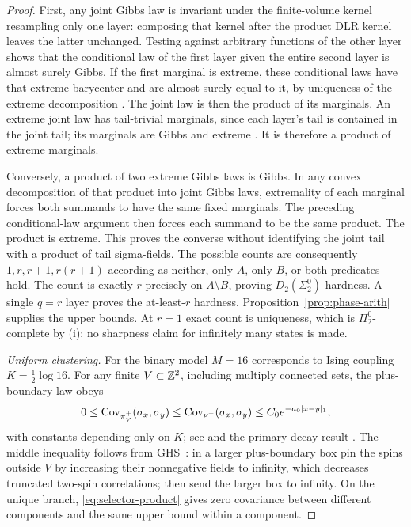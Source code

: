 \begin{proof}
First, any joint Gibbs law is invariant under the finite-volume kernel
resampling only one layer: composing that kernel after the product DLR
kernel leaves the latter unchanged. Testing against arbitrary functions of
the other layer shows that the conditional law of the first layer given the
entire second layer is almost surely Gibbs. If the first marginal is extreme,
these conditional laws have that extreme barycenter and are almost surely
equal to it, by uniqueness of the extreme decomposition
\cite[Theorem 7.26]{Georgii}. The joint law is then the product of its marginals.
An extreme joint law has tail-trivial marginals, since each layer's tail is
contained in the joint tail; its marginals are Gibbs and extreme
\cite[Theorem 7.7]{Georgii}. It is therefore a product of extreme marginals.

Conversely, a product of two extreme Gibbs laws is Gibbs. In any convex
decomposition of that product into joint Gibbs laws, extremality of each
marginal forces both summands to have the same fixed marginals. The preceding
conditional-law argument then forces each summand to be the same product.
The product is extreme. This proves the converse without identifying the
joint tail with a product of tail sigma-fields.
The possible counts are consequently $1,r,r+1,r(r+1)$ according as neither,
only $A$, only $B$, or both predicates hold. The count is exactly $r$ precisely
on $A\setminus B$, proving $D_2(\Sigma^0_2)$ hardness. A single $q=r$ layer
proves the at-least-$r$ hardness. Proposition~\ref{prop:phase-arith} supplies
the upper bounds. At $r=1$ exact count is uniqueness, which is
$\Pi^0_2$-complete by (i); no sharpness claim for infinitely many states is made.

\emph{Uniform clustering.}
For the binary model $M=16$ corresponds to Ising coupling $K=\frac12\log16$.
For any finite $V\subset\mathbb Z^2$, including multiply connected sets, the
plus-boundary law obeys
\begin{equation}\label{eq:selector-covariance}
 0\le\operatorname{Cov}_{\pi_V^+}(\sigma_x,\sigma_y)
 \le\operatorname{Cov}_{\nu^+}(\sigma_x,\sigma_y)
 \le C_0e^{-a_0|x-y|_1},
\end{equation}
with constants depending only on $K$; see
\cite[Section 2.3.1, (2.32)--(2.33)]{BCK2003} and the primary decay result
\cite{CCS1987}. The middle inequality follows from GHS~\cite{GHS1970}:
in a larger plus-boundary box pin the spins outside $V$ by increasing their
nonnegative fields to infinity, which decreases truncated two-spin
correlations; then send the larger box to infinity. On the unique branch,
\eqref{eq:selector-product} gives zero covariance between different components
and the same upper bound within a component.


\end{proof}

